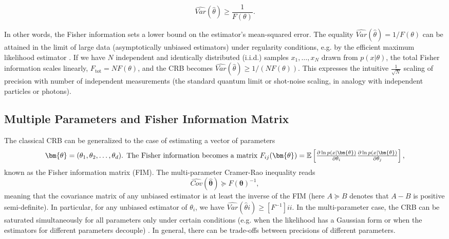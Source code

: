\begin{equation}
\widehat{Var}(\hat{\theta})\ge\frac{1}{F(\theta)}.
\label{eq:CRB-classical}
\end{equation}

In other words, the Fisher information sets a lower bound on the
estimator’s mean-squared error. The equality $\widehat{Var}(\hat{\theta}) =
1/F(\theta)$ can be attained in the limit of large data
(asymptotically unbiased estimators) under regularity conditions,
e.g. by the efficient maximum likelihood estimator \cite{Kay1993}. If
we have $N$ independent and identically distributed (i.i.d.) samples
$x_1,\dots,x_N$ drawn from $p(x|\theta)$, the total Fisher information
scales linearly, $F_{\text{tot}} = N F(\theta)$, and the CRB becomes
$\widehat{Var}(\hat{\theta}) \ge 1/(N F(\theta))$. This expresses the intuitive
$\frac{1}{\sqrt{N}}$ scaling of precision with number of independent
measurements (the standard quantum limit or shot-noise scaling, in
analogy with independent particles or photons).



\subsection{Multiple Parameters and Fisher Information Matrix}



The classical CRB can be generalized to the case of estimating a
vector of parameters
\[
\bm{\theta} =
(\theta_1,\theta_2,\dots,\theta_d)$. The Fisher information becomes a
matrix $F_{ij}(\bm{\theta}) = \mathbb{E}\left[ \frac{\partial \ln
    p(x|\bm{\theta})}{\partial \theta_i}\frac{\partial \ln
    p(x|\bm{\theta})}{\partial \theta_j} \right],
\]
known as the Fisher information matrix (FIM). The multi-parameter
Cramer-Rao inequality reads
\begin{equation}
\widehat{Cov}(\hat{\bm{\theta}}) \succeq F(\bm{\theta})^{-1},
\end{equation}
meaning that the covariance matrix of any unbiased estimator is at
least the inverse of the FIM (here $A \succeq B$ denotes that $A - B$
is positive semi-definite). In particular, for any unbiased estimator
of $\theta_i$, we have $\widehat{Var}(\hat{\theta}i) \ge [F^{-1}]{ii}$. In the
multi-parameter case, the CRB can be saturated simultaneously for all
parameters only under certain conditions (e.g. when the likelihood has
a Gaussian form or when the estimators for different parameters
decouple) \cite{Kay1993}. In general, there can be trade-offs between
precisions of different parameters.



